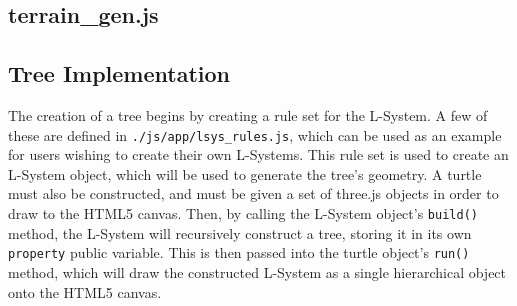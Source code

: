\documentclass{article}
\newcommand{\tab}{\hspace*{2em}}
\begin{document}
            \subsection{terrain\_gen.js}
        \subsection{Tree Implementation}
    \tab The creation of a tree begins by creating a rule set for the L-System. A few of these are
defined in \verb|./js/app/lsys_rules.js|, which can be used as an example for users wishing to
create their own L-Systems. This rule set is used to create an L-System object, which will be used
to generate the tree's geometry. A turtle must also be constructed, and must be given a set of
three.js objects in order to draw to the HTML5 canvas. Then, by calling the L-System object's
\verb|build()| method, the L-System will recursively construct a tree, storing it in its own
\verb|property| public variable. This is then passed into the turtle object's \verb|run()| method,
which will draw the constructed L-System as a single hierarchical object onto the HTML5 canvas.
\end{document}
